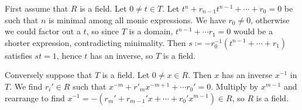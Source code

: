First assume that $R$ is a field. Let $0\neq t \in T$. Let
$t^n + r_{n-1}t^{n-1} + \cdots + r_0 = 0$ be such that $n$ is minimal
among all monic expressions. We have $r_0\neq 0$, otherwise we could factor out
a $t$, so since $T$ is a domain, $t^{n-1}+\cdots r_1 = 0$ would be a shorter expression,
contradicting minimality. Then $s\coloneqq -r_0^{-1}(t^{n-1}+\cdots+ r_1)$ satisfies
$st = 1$, hence $t$ has an inverse, so $T$ is a field.

Conversely suppose that $T$ is a field. Let $0\neq x \in R$. Then $x$ has an inverse
$x^{-1}$ in $T$. We find $r_i' \in R$ such that $x^{-m}+r'_mx^{-m+1}+\cdots r_0' = 0$.
Multiply by $x^{m-1}$ and rearrange to find $x^{-1} = -(r_m' + r_{m-1}'x + \cdots + r_0'x^{m-1}) \in R$,
so $R$ is a field.
